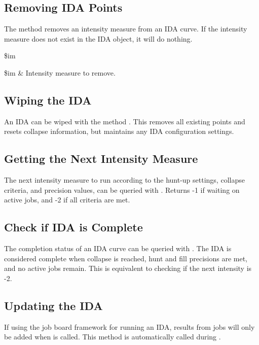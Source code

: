 \documentclass{article}
\renewcommand{\^}[1]{\textsuperscript{#1}}
\renewcommand{\_}[1]{\textsubscript{#1}}
\begin{document}
\subsection{Removing IDA Points}
The method  removes an intensity measure from an IDA curve.
If the intensity measure does not exist in the IDA object, it will do nothing.
\begin{syntax}
 \$im
\end{syntax}
\begin{args}
\$im & Intensity measure to remove.
\end{args}
\clearpage
\subsection{Wiping the IDA}
An IDA can be wiped with the method .
This removes all existing points and resets collapse information, but maintains any IDA configuration settings.
\begin{syntax}
\end{syntax}

\subsection{Getting the Next Intensity Measure}
The next intensity measure to run according to the hunt-up settings, collapse criteria, and precision values, can be queried with . 
Returns -1 if waiting on active jobs, and -2 if all criteria are met. 
\begin{syntax}
\end{syntax}

\subsection{Check if IDA is Complete}
The completion status of an IDA curve can be queried with . 
The IDA is considered complete when collapse is reached, hunt and fill precisions are met, and no active jobs remain.
This is equivalent to checking if the next intensity is -2.
\begin{syntax}
\end{syntax}

\subsection{Updating the IDA}
If using the job board framework for running an IDA, results from jobs will only be added when  is called. 
This method is automatically called during  .
\begin{syntax}
\end{syntax}
\clearpage
\end{document}
